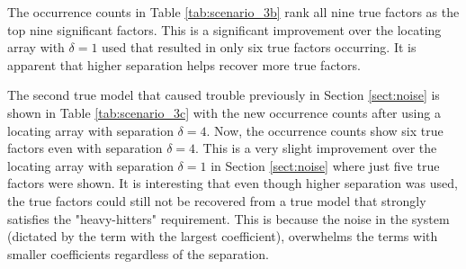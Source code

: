 The occurrence counts in Table \ref{tab:scenario_3b} rank all nine true factors as the top nine significant factors.
This is a significant improvement over the locating array with $\delta = 1$ used that resulted in only six true factors occurring.
It is apparent that higher separation helps recover more true factors.

The second true model that caused trouble previously in Section \ref{sect:noise} is shown in Table \ref{tab:scenario_3c} with the new occurrence counts after using a locating array with separation $\delta=4$.
Now, the occurrence counts show six true factors even with separation $\delta=4$.
This is a very slight improvement over the locating array with separation $\delta=1$ in Section \ref{sect:noise} where just five true factors were shown.
It is interesting that even though higher separation was used, the true factors could still not be recovered from a true model that strongly satisfies the "heavy-hitters" requirement.
This is because the noise in the system (dictated by the term with the largest coefficient), overwhelms the terms with smaller coefficients  regardless of the separation.

